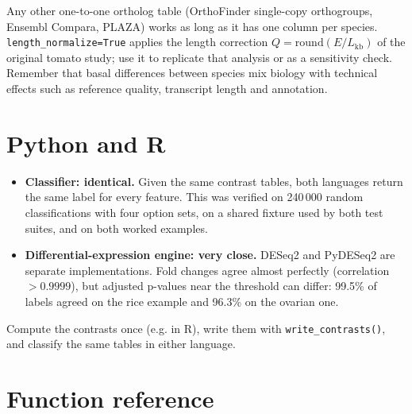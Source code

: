\documentclass[11pt,a4paper]{article}
\newcommand{\code}[1]{\texttt{\color{navy!85!black}#1}}
\begin{document}
Any other one-to-one ortholog table (OrthoFinder single-copy orthogroups, Ensembl Compara, PLAZA)
works as long as it has one column per species. \code{length\_normalize=True} applies the length
correction \(Q=\mathrm{round}(E/L_{\mathrm{kb}})\) of the original tomato study; use it to replicate that
analysis or as a sensitivity check. Remember that basal differences between species mix biology with
technical effects such as reference quality, transcript length and annotation.

\section{Python and R}

\begin{itemize}
  \item \textbf{Classifier: identical.} Given the same contrast tables, both languages return the same
        label for every feature. This was verified on 240\,000 random classifications with four option
        sets, on a shared fixture used by both test suites, and on both worked examples.
  \item \textbf{Differential-expression engine: very close.} DESeq2 and PyDESeq2 are separate
        implementations. Fold changes agree almost perfectly (correlation \(>0.9999\)), but adjusted
        p-values near the threshold can differ: 99.5\% of labels agreed on the rice example and 96.3\% on
        the ovarian one.
\end{itemize}

\begin{tip}
Compute the contrasts once (e.g. in R), write them with \code{write\_contrasts()}, and classify the same
tables in either language.
\end{tip}

\section{Function reference}
\end{document}
